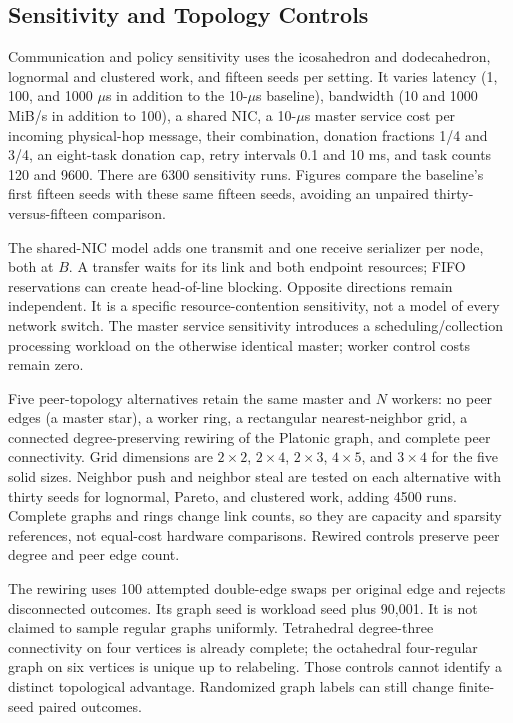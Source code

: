 \documentclass[10pt,journal,twocolumn]{IEEEtran}
\begin{document}
\subsection{Sensitivity and Topology Controls}
Communication and policy sensitivity uses the icosahedron and dodecahedron, lognormal and clustered work, and fifteen seeds per setting. It varies latency (1, 100, and 1000 $\mu$s in addition to the 10-$\mu$s baseline), bandwidth (10 and 1000 MiB/s in addition to 100), a shared NIC, a 10-$\mu$s master service cost per incoming physical-hop message, their combination, donation fractions 1/4 and 3/4, an eight-task donation cap, retry intervals 0.1 and 10 ms, and task counts 120 and 9600. There are 6300 sensitivity runs. Figures compare the baseline's first fifteen seeds with these same fifteen seeds, avoiding an unpaired thirty-versus-fifteen comparison.

The shared-NIC model adds one transmit and one receive serializer per node, both at $B$. A transfer waits for its link and both endpoint resources; FIFO reservations can create head-of-line blocking. Opposite directions remain independent. It is a specific resource-contention sensitivity, not a model of every network switch. The master service sensitivity introduces a scheduling/collection processing workload on the otherwise identical master; worker control costs remain zero.

Five peer-topology alternatives retain the same master and $N$ workers: no peer edges (a master star), a worker ring, a rectangular nearest-neighbor grid, a connected degree-preserving rewiring of the Platonic graph, and complete peer connectivity. Grid dimensions are $2\times2$, $2\times4$, $2\times3$, $4\times5$, and $3\times4$ for the five solid sizes. Neighbor push and neighbor steal are tested on each alternative with thirty seeds for lognormal, Pareto, and clustered work, adding 4500 runs. Complete graphs and rings change link counts, so they are capacity and sparsity references, not equal-cost hardware comparisons. Rewired controls preserve peer degree and peer edge count.

The rewiring uses 100 attempted double-edge swaps per original edge and rejects disconnected outcomes. Its graph seed is workload seed plus 90,001. It is not claimed to sample regular graphs uniformly. Tetrahedral degree-three connectivity on four vertices is already complete; the octahedral four-regular graph on six vertices is unique up to relabeling. Those controls cannot identify a distinct topological advantage. Randomized graph labels can still change finite-seed paired outcomes.
\end{document}
